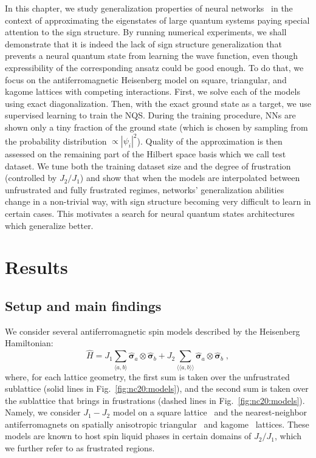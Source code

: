 In this chapter, we study generalization properties of neural networks~\cite{Hinton93keepingneural,dziugaite2017computing} in the context of approximating the eigenstates of large quantum systems paying special attention to the sign structure. By running numerical experiments, we shall demonstrate that it is indeed the lack of sign structure generalization that prevents a neural quantum state from learning the wave function, even though expressibility of the corresponding ansatz could be good enough. To do that, we focus on the antiferromagnetic Heisenberg model on square, triangular, and kagome lattices with competing interactions. First, we solve each of the models using exact diagonalization. Then, with the exact ground state as a target, we use supervised learning to train the NQS. During the training procedure, NNs are shown only a tiny fraction of the ground state (which is chosen by sampling from the probability distribution $\propto |\psi_i|^2$). Quality of the approximation is then assessed on the remaining part of the Hilbert space basis which we call test dataset. We tune both the training dataset size and the degree of frustration (controlled by $J_2/J_1$) and show that when the models are interpolated between unfrustrated and fully frustrated regimes, networks' generalization abilities change in a non-trivial way, with sign structure becoming very difficult to learn in certain cases. This motivates a search for neural quantum states architectures which generalize better.

\section{Results}

\subsection{Setup and main findings}

We consider several antiferromagnetic spin models described by the Heisenberg Hamiltonian:
\begin{equation}
    \hat H = J_1 \sum\limits_{\langle a, b \rangle} \hat{\boldsymbol{\sigma}}_a \otimes \hat{\boldsymbol{\sigma}}_b + J_2  \sum\limits_{\langle \langle a, b \rangle \rangle} \hat{\boldsymbol{\sigma}}_a \otimes \hat{\boldsymbol{\sigma}}_b \;,
    \label{eq:hamiltonian}
\end{equation}
where, for each lattice geometry, the first sum is taken over the unfrustrated sublattice (solid lines in Fig.~\ref{fig:nc20:models}), and the second sum is taken over the sublattice that brings in frustrations (dashed lines in Fig.~\ref{fig:nc20:models}). Namely, we consider $J_1-J_2$ model on a square lattice~\cite{schulz1996magnetic,richter2010spin, jiang2012spin} and the nearest-neighbor antiferromagnets on spatially anisotropic triangular~\cite{yunoki2006two} and kagome~\cite{schnyder2008spatially,li2012spin} lattices. These models are known to host spin liquid phases in certain domains of $J_2/J_1$, which we further refer to as frustrated regions.


